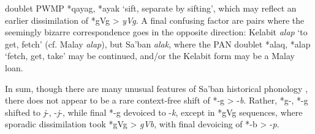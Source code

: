 \documentclass[output=paper]{langscibook}
\begin{document}
doublet PWMP *qayag, *ayak ‘sift, separate by sifting’, which may reflect an earlier dissimilation of *gVg > \textit{yVg}. A final confusing factor are pairs where the seemingly bizarre correspondence goes in the opposite direction: Kelabit \textit{alap} ‘to get, fetch’ (cf. Malay \textit{alap}), but Sa’ban \textit{alak}, where the PAN doublet *alaq, *alap ‘fetch, get, take’ may be continued, and/or the Kelabit form may be a Malay loan.

In sum, though there are many unusual features of Sa’ban historical phonology \citep{Blust2001}, there does not appear to be a rare context-free shift of *-g > -\textit{b}. Rather, *g-, *-g shifted to \textit{j}-, -\textit{j}-, while final *-g devoiced to -\textit{k}, except in *gVg sequences, where sporadic dissimilation took *gVg > \textit{gVb}, with final devoicing of *-b > -\textit{p}.
\end{document}
